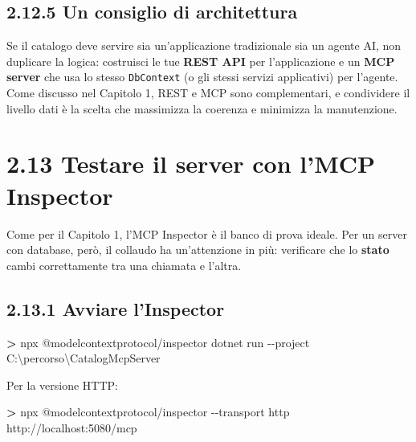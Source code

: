 \documentclass[
  italian,
  10pt,
]{book}
\newenvironment{Shaded}{\begin{snugshade}}{\end{snugshade}}
\newcommand{\AttributeTok}[1]{\textcolor[rgb]{0.13,0.29,0.53}{#1}}
\newcommand{\DataTypeTok}[1]{\textcolor[rgb]{0.13,0.29,0.53}{#1}}
\newcommand{\ExtensionTok}[1]{#1}
\newcommand{\NormalTok}[1]{#1}
\newcommand{\OperatorTok}[1]{\textcolor[rgb]{0.81,0.36,0.00}{\textbf{#1}}}
\begin{document}
\subsection{2.12.5 Un consiglio di
architettura}\label{un-consiglio-di-architettura}

Se il catalogo deve servire sia un'applicazione tradizionale sia un
agente AI, non duplicare la logica: costruisci le tue \textbf{REST API}
per l'applicazione e un \textbf{MCP server} che usa lo stesso
\texttt{DbContext} (o gli stessi servizi applicativi) per l'agente. Come
discusso nel Capitolo 1, REST e MCP sono complementari, e condividere il
livello dati è la scelta che massimizza la coerenza e minimizza la
manutenzione.

\section{2.13 Testare il server con l'MCP
Inspector}\label{testare-il-server-con-lmcp-inspector}

Come per il Capitolo 1, l'MCP Inspector è il banco di prova ideale. Per
un server con database, però, il collaudo ha un'attenzione in più:
verificare che lo \textbf{stato} cambi correttamente tra una chiamata e
l'altra.

\subsection{2.13.1 Avviare l'Inspector}\label{avviare-linspector}

\begin{Shaded}
\begin{Highlighting}[]
\OperatorTok{\textgreater{}}\NormalTok{ npx }\ExtensionTok{@modelcontextprotocol/inspector}\NormalTok{ dotnet run }\AttributeTok{{-}{-}project}\NormalTok{ C:}\DataTypeTok{\textbackslash{}p}\NormalTok{ercorso}\DataTypeTok{\textbackslash{}C}\NormalTok{atalogMcpServer}
\end{Highlighting}
\end{Shaded}

Per la versione HTTP:

\begin{Shaded}
\begin{Highlighting}[]
\OperatorTok{\textgreater{}}\NormalTok{ npx }\ExtensionTok{@modelcontextprotocol/inspector} \AttributeTok{{-}{-}transport}\NormalTok{ http http://localhost:5080/mcp}
\end{Highlighting}
\end{Shaded}
\end{document}

